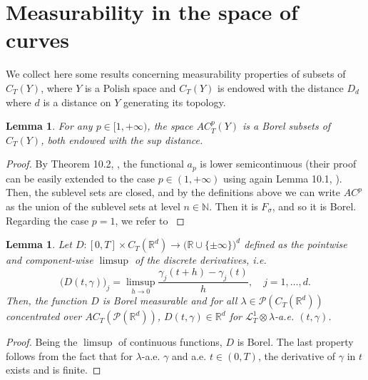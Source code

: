 \documentclass[10pt,leqno]{amsart}
\numberwithin{equation}{section}
\newtheorem{lemma}[teorema]{Lemma}
\newcommand{\R}{\mathbb{R}}
\newcommand{\N}{\mathbb{N}}
\newcommand{\PP}{\mathcal{P}}
\begin{document}
\section{Measurability in the space of curves}\label{appendix meas for curves}
We collect here some results concerning measurability properties of subsets of $C_T(Y)$, where $Y$ is a Polish space and 
$C_T(Y)$ is endowed with the distance $D_{d}$
where $d$ is a distance on $Y$ generating its topology.






\begin{lemma}\label{meas of AC^p}
    For any $p\in [1,+\infty)$, the space $AC^p_T(Y)$ is a Borel subsets of $C_T(Y)$, both endowed with the sup distance.
\end{lemma}

\begin{proof}
    By Theorem 10.2, \cite{ambrosio2021lectures}, the functional $a_p$ is lower semicontinuous (their proof can be easily extended to the case $p\in(1,+\infty)$ using again Lemma 10.1, \cite{ambrosio2021lectures}). Then, the sublevel sets are closed, and by the definitions above we can write $AC^p$ as the union of the sublevel sets at level $n \in \N$. Then it is $F_\sigma$, and so it is Borel. 
    Regarding the case $p=1$, we refer to \cite[§2.2]{ambrosio2014calculus}
\end{proof}



\begin{lemma}\label{meas of D(t,gamma)}
    Let $D:[0,T]\times C_T(\R^d) \to \big(\R\cup\{\pm \infty\}\big)^d$ defined as the pointwise and component-wise $\limsup$ of the discrete derivatives, i.e. 
        \[\big(D(t,\gamma)\big)_j = \limsup_{h \to 0}\frac{\gamma_j(t+h)- \gamma_j(t)}{h}, \quad j = 1,\dots,d.\]
    Then, the function $D$ is Borel measurable and for all $\lambda \in \PP(C_T(\R^d))$ concentrated over $AC_T(\PP(\R^d))$, $D(t,\gamma)\in \R^d$ for $\mathcal{L}^1_T\otimes \lambda$-a.e. $(t,\gamma)$.
\end{lemma}

\begin{proof}
    Being the $\limsup$ of continuous functions, $D$ is Borel. The last property follows from the fact that for $\lambda$-a.e. $\gamma$ and a.e. $t\in (0,T)$, the derivative of $\gamma$ in $t$ exists and is finite. 
\end{proof}
\end{document}
